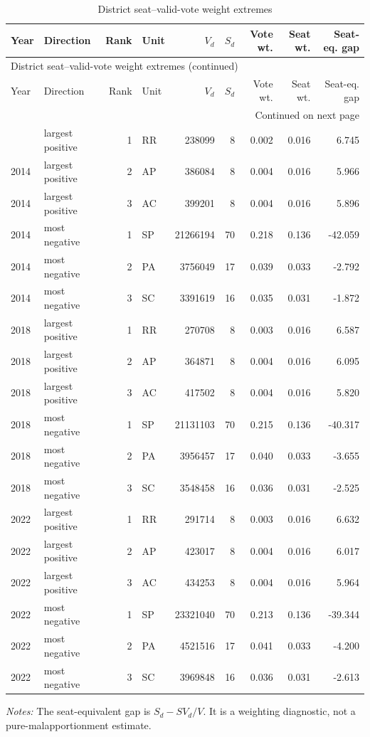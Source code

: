 \begingroup
\scriptsize
\setlength{\tabcolsep}{3.2pt}
\begin{longtable}{llrlrrrrr}
\caption{District seat--valid-vote weight extremes}\label{tab:intermediate-district-weight} \\
\toprule
Year & Direction & Rank & Unit & \(V_d\) & \(S_d\) & Vote wt. & Seat wt. & Seat-eq. gap \\
\midrule
\endfirsthead
\multicolumn{9}{l}{\footnotesize District seat--valid-vote weight extremes (continued)} \\
\toprule
Year & Direction & Rank & Unit & \(V_d\) & \(S_d\) & Vote wt. & Seat wt. & Seat-eq. gap \\
\midrule
\endhead
\midrule
\multicolumn{9}{r}{\footnotesize Continued on next page} \\
\endfoot
\bottomrule
\endlastfoot
2014 & largest positive & 1 & RR & 238099 & 8 & 0.002 & 0.016 & 6.745 \\
2014 & largest positive & 2 & AP & 386084 & 8 & 0.004 & 0.016 & 5.966 \\
2014 & largest positive & 3 & AC & 399201 & 8 & 0.004 & 0.016 & 5.896 \\
2014 & most negative & 1 & SP & 21266194 & 70 & 0.218 & 0.136 & -42.059 \\
2014 & most negative & 2 & PA & 3756049 & 17 & 0.039 & 0.033 & -2.792 \\
2014 & most negative & 3 & SC & 3391619 & 16 & 0.035 & 0.031 & -1.872 \\
2018 & largest positive & 1 & RR & 270708 & 8 & 0.003 & 0.016 & 6.587 \\
2018 & largest positive & 2 & AP & 364871 & 8 & 0.004 & 0.016 & 6.095 \\
2018 & largest positive & 3 & AC & 417502 & 8 & 0.004 & 0.016 & 5.820 \\
2018 & most negative & 1 & SP & 21131103 & 70 & 0.215 & 0.136 & -40.317 \\
2018 & most negative & 2 & PA & 3956457 & 17 & 0.040 & 0.033 & -3.655 \\
2018 & most negative & 3 & SC & 3548458 & 16 & 0.036 & 0.031 & -2.525 \\
2022 & largest positive & 1 & RR & 291714 & 8 & 0.003 & 0.016 & 6.632 \\
2022 & largest positive & 2 & AP & 423017 & 8 & 0.004 & 0.016 & 6.017 \\
2022 & largest positive & 3 & AC & 434253 & 8 & 0.004 & 0.016 & 5.964 \\
2022 & most negative & 1 & SP & 23321040 & 70 & 0.213 & 0.136 & -39.344 \\
2022 & most negative & 2 & PA & 4521516 & 17 & 0.041 & 0.033 & -4.200 \\
2022 & most negative & 3 & SC & 3969848 & 16 & 0.036 & 0.031 & -2.613 \\
\end{longtable}
\noindent\footnotesize\textit{Notes:} The seat-equivalent gap is \(S_d-SV_d/V\). It is a weighting diagnostic, not a pure-malapportionment estimate.
\endgroup
